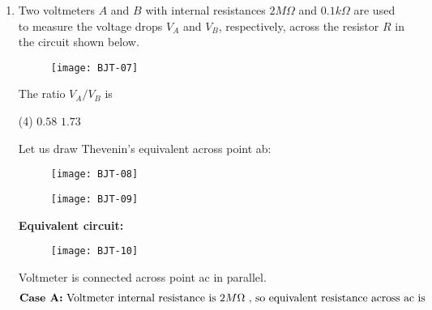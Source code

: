 \begin{enumerate}
\begin{tasks}
\end{tasks}
The material that would make the most sensitive temperature sensor, when used at temperatures between $T_{1}$ and $T_{2}$, is
{}
\begin{tasks}(4)
\task[\textbf{A.}] A
\task[\textbf{B.}] B
\task[\textbf{C.}] C
\task[\textbf{D.}] D
\end{tasks}
\begin{answer}
\begin{align*}
\intertext{ For the temperature sensor, the variation in the resistivity of material should be as large as possible without any local maximum or minimum. Option (A) \& (D) shows minimum while in (B) gradient is very low in comparison to (C). Thus option (C) is the correct answer}
\end{align*}
So the correct answer is \textbf{Option (C)}
\end{answer}
\item Two voltmeters $A$ and $B$ with internal resistances $2 M \Omega$ and $0.1 k \Omega$ are used to measure the voltage drops $V_{A}$ and $V_{B}$, respectively, across the resistor $R$ in the circuit shown below.\\
\begin{figure}[H]
	\centering
	\texttt{[image: BJT-07]}
\end{figure}
The ratio $V_{A} / V_{B}$ is
{}
\begin{tasks}(4)
\task[\textbf{A.}] $0.58$
\task[\textbf{B.}] $1.73$
\end{tasks}
\begin{answer}
Let us draw Thevenin’s equivalent across point ab:\\
\begin{figure}[H]
	\centering
	\texttt{[image: BJT-08]}
\end{figure}
\begin{figure}[H]
	\centering
	\texttt{[image: BJT-09]}
\end{figure}
\textbf{Equivalent circuit:}\\
\begin{figure}[H]
	\centering
	\texttt{[image: BJT-10]}
\end{figure}
Voltmeter is connected across point ac in parallel.
\begin{align*}
\intertext{\textbf{Case A:} Voltmeter internal resistance is $2M\Omega $ , so equivalent resistance across ac is}

\end{align*}
\end{answer}
\end{enumerate}
